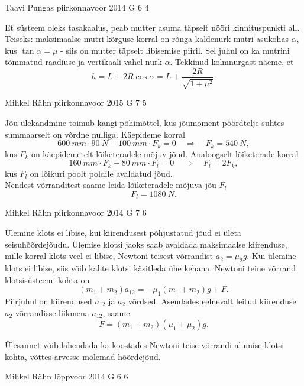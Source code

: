\documentclass[11pt, twoside]{article}
\begin{document}
{%
{Taavi Pungas} %
{piirkonnavoor} %
{2014} %
{G 6} %
{4} %
{

\ifSolution
Et süsteem oleks tasakaalus, peab mutter asuma täpselt nööri kinnituspunkti all. Teiseks: maksimaalse mutri kõrguse korral on rõnga kaldenurk mutri asukohas $\alpha$, kus $\tan \alpha = \mu$ - siis on mutter täpselt libisemise piiril. Sel juhul on ka mutrini tõmmatud raadiuse ja vertikaali vahel nurk $\alpha$. Tekkinud kolmnurgast näeme, et
\[
h=L+2R\cos \alpha = L+ \frac{2R}{\sqrt{1+\mu^2}}.
\]
\fi
}

{Mihkel Rähn} %
{piirkonnavoor} %
{2015} %
{G 7} %
{5} %
{

\ifSolution
Jõu ülekandmine toimub kangi põhimõttel, kus jõumoment pöördtelje suhtes summaarselt on võrdne nulliga. Käepideme korral
\[ \SI{600}{mm}\cdot\SI{90}{N}-\SI{100}{mm}\cdot F_k = 0 \quad\Rightarrow\quad F_k = \SI{540}{N}, \]
kus $F_k$ on käepidemetelt lõiketeradele mõjuv jõud. Analoogselt lõiketerade korral
\[ \SI{160}{mm}\cdot F_k - \SI{80}{mm}\cdot F_l = 0 \quad\Rightarrow\quad F_l = 2F_k, \]
kus $F_l$ on lõikuri poolt poldile avaldatud jõud.\\
Nendest võrranditest saame leida lõiketeradele mõjuva jõu $F_l$
\[ F_l = \SI{1080}{N}.\]
\fi
}

{Mihkel Rähn} %
{piirkonnavoor} %
{2014} %
{G 7} %
{6} %
{

\ifSolution
Ülemine klots ei libise, kui kiirendusest põhjustatud jõud ei ületa seisuhõõrdejõudu. Ülemise klotsi jaoks saab avaldada maksimaalse kiirenduse, mille korral klots veel ei libise, Newtoni teisest võrrandist $a_2=\mu_2g$. Kui ülemine klots ei libise, siis võib kahte klotsi käsitleda ühe kehana. Newtoni teine võrrand klotsisüsteemi kohta on 
\[
(m_1+m_2)a_{12} = -\mu_1 (m_1+m_2)g+F.
\]
Piirjuhul on kiirendused $a_{12}$ ja $a_2$ võrdsed. Asendades eelnevalt leitud kiirenduse $a_2$ võrrandisse liikmena $a_{12}$, saame
\[
F=(m_1+m_2)(\mu_1+\mu_2)g.
\]


Ülesannet võib lahendada ka koostades Newtoni teise võrrandi alumise klotsi kohta, võttes arvesse mõlemad hõõrdejõud. 
\fi
}

{Mihkel Rähn} %
{lõppvoor} %
{2014} %
{G 6} %
{6} %
{

}}
\end{document}
